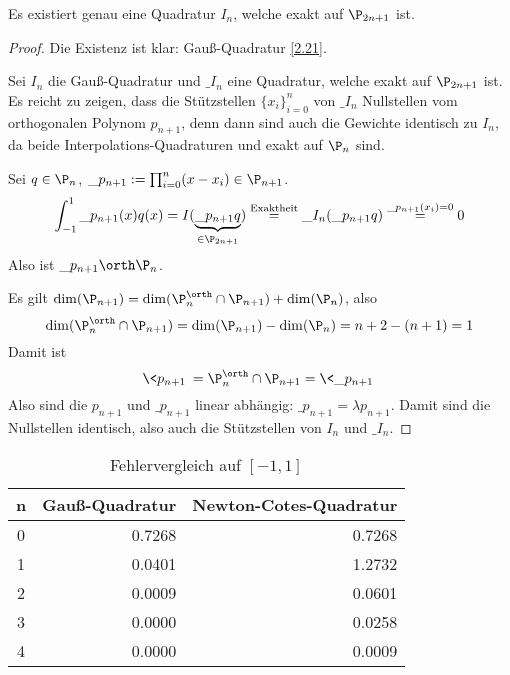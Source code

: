 \documentclass[11pt]{scrbook}
\begin{document}
\begin{st}
	\label{2.23}
	Es existiert genau eine Quadratur $I_n$, welche exakt auf $\P_{2n+1}$ ist.
	\begin{proof}
		Die Existenz ist klar: Gauß-Quadratur \ref{2.21}.

		Sei $I_n$ die Gauß-Quadratur und $\_{I_n}$ eine Quadratur, welche exakt auf $\P_{2n+1}$ ist.
		Es reicht zu zeigen, dass die Stützstellen $\{x_i\}_{i=0}^n$ von $\_{I_n}$ Nullstellen vom orthogonalen Polynom $p_{n+1}$, denn dann sind auch die Gewichte identisch zu $I_n$, da beide Interpolations-Quadraturen und exakt auf $\P_n$ sind.
	
		Sei $q\in \P_n$, $\_p_{n+1} := \prod_{i=0}^n (x-x_i) \in \P_{n+1}$.
		\[
			\int_{-1}^1 \_p_{n+1}(x) q(x) 
			= I(\underbrace{\_p_{n+1} q}_{\in \P_{2n+1}})
			\stackrel{\text{Exaktheit}}= \_I_n (\_p_{n+1}q)
			\stackrel{\_p_{n+1}(x_i)=0}= 0
		\]
		Also ist $\_p_{n+1} \orth \P_n$.

		Es gilt $\dim(\P_{n+1}) = \dim( \P_n^\orth \cap \P_{n+1}) + \dim (\P_n)$, also
		\[
			\dim( \P_n^\orth \cap \P_{n+1}) = \dim(\P_{n+1}) - \dim(\P_n) = n+2 - (n+1) = 1
		\]
		Damit ist 
		\[
			 \<p_{n+1}\> = \P_n^\orth \cap \P_{n+1} = \<\_p_{n+1}\>
		\]
		Also sind die $p_{n+1}$ und $\_p_{n+1}$ linear abhängig: $\_p_{n+1} = \lambda p_{n+1}$.
		Damit sind die Nullstellen identisch, also auch die Stützstellen von $I_n$ und $\_I_n$.
	\end{proof}
\end{st}

\begin{ex*}[Vergleich von Newton-Cotes und Gauß-Quadratur auf $f(x)=\cos(x\f \pi 2)$ auf]
	\begin{table}[!ht]
		\centering
		\caption{Fehlervergleich auf $[-1,1]$}
		\begin{tabular}{c|r|r}
			n & Gauß-Quadratur & Newton-Cotes-Quadratur \\ \hline
			0 & 0.7268 & 0.7268 \\
			1 & 0.0401 & 1.2732 \\
			2 & 0.0009 & 0.0601 \\
			3 & 0.0000 & 0.0258 \\
			4 & 0.0000 & 0.0009
		\end{tabular}
	\end{table}
\end{ex*}
\end{document}
